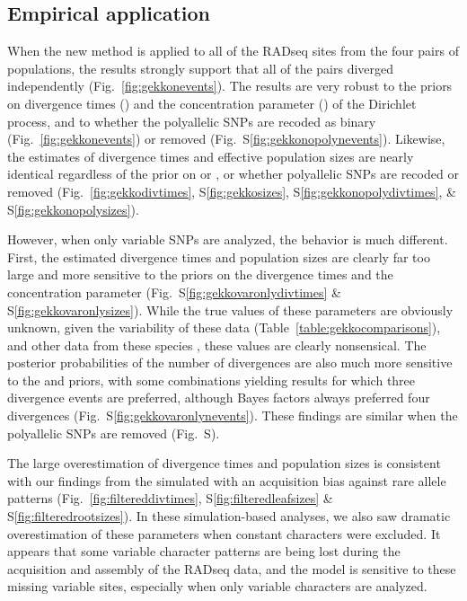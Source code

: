 \subsection{Empirical application}

When the new method is applied to all of the RADseq sites from the
four pairs of  populations, the results strongly
support that all of the pairs diverged independently
(Fig.~\ref{fig:gekkonevents}).
The results are very robust to the priors on divergence times (\divtime)
and the concentration parameter (\concentration) of the Dirichlet process, and
to whether the polyallelic SNPs are recoded as binary
(Fig.~\ref{fig:gekkonevents})
or removed
(Fig.~S\ref{fig:gekkonopolynevents}).
Likewise, the estimates of divergence times and effective population sizes
are nearly identical regardless of the prior on \divtime or \concentration,
or whether polyallelic SNPs are recoded or removed
(Fig.\ 
\ref{fig:gekkodivtimes},
S\ref{fig:gekkosizes},
S\ref{fig:gekkonopolydivtimes},
\&
S\ref{fig:gekkonopolysizes}).

\ifembed{



}{}

However, when only variable SNPs are analyzed, the behavior is much different.
First, the estimated divergence times and population sizes are clearly far too
large and more sensitive to the priors on the divergence times and the
concentration parameter
(Fig.\ 
S\ref{fig:gekkovaronlydivtimes}
\&
S\ref{fig:gekkovaronlysizes}).
While the true values of these parameters are obviously unknown, given the
variability of these data (Table~\ref{table:gekkocomparisons}), and other data
from these species \citep{Siler2012, Siler2014kikuchii}, these values are
clearly nonsensical.
The posterior probabilities of the number of divergences are also
much more sensitive to the \divtime and \concentration priors,
with some combinations yielding results for which three divergence events
are preferred, although Bayes factors always preferred four divergences
(Fig.~S\ref{fig:gekkovaronlynevents}).
These findings are similar when the polyallelic SNPs are removed
(Fig.\ 
S).

The large overestimation of divergence times and population sizes is consistent
with our findings from the \datasets simulated with an acquisition bias against
rare allele patterns
(Fig.\ 
\ref{fig:filtereddivtimes},
S\ref{fig:filteredleafsizes}
\&
S\ref{fig:filteredrootsizes}).
In these simulation-based analyses, we also saw dramatic overestimation of
these parameters when constant characters were excluded.
It appears that some variable character patterns are being lost during the
acquisition and assembly of the RADseq data, and the model is sensitive to
these missing variable sites, especially when only variable characters are
analyzed.

